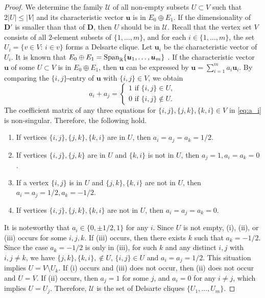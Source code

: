 \documentclass[a4paper, 11pt]{article}
\newcommand{\D}{\boldsymbol{D}}
\newcommand{\uv}{\boldsymbol{u}}
\theoremstyle{definition}
\begin{document}
\begin{proof}
We determine the family $\mathcal{U}$ of all non-empty subsets $U\subset V$ such that $2|U|\leq |V|$ and its characteristic vector $\uv$ is in $E_0 \oplus E_1$. 
If the dimensionality of $\D'$ is smaller than
that of $\D$, then $U$ should be in $\mathcal{U}$. 
Recall that the vertex set $V$ consists of all $2$-element subsets of $\{1,\ldots, m\}$, and for each $i \in \{1,\ldots, m\}$, the set $U_i = \{v \in V \colon\, i \in v\}$ forms a Delsarte clique. 
Let $\uv_i$ be the characteristic vector of $U_i$. 
It is known that $E_0 \oplus E_1={\rm Span}_{\mathbb{R}}\{\uv_1,\ldots, \uv_m\}$ \cite{M03}.  
If the characteristic vector $\uv$ of some $U\subset V$ is in $E_0 \oplus E_1$, then $\uv$ can be expressed by $\uv=\sum_{i=1}^m a_i \uv_i$. 
By comparing the $\{i,j\}$-entry of $\uv$ with $\{i,j\} \in V$, we obtain  
\begin{equation} \label{eq:a_i}
a_i+a_j=\begin{cases}
1 \text{ if $\{i,j\} \in U$},\\
0 \text{ if $\{i,j\} \not\in U$}.
\end{cases}
\end{equation}
The coefficient matrix of any three equations for $\{i,j\},\{j,k\}, \{k,i\} \in V$ in \eqref{eq:a_i} is non-singular. Therefore, the following hold. 
\begin{enumerate}
\item[(i)] If vertices $\{i,j\},\{j,k\},\{k,i\}$ are in $U$, then $a_i=a_j=a_k=1/2$.  
\item[(ii)] If vertices $\{i,j\},\{j,k\}$ are in $U$ and $\{k,i\}$ is not in $U$, then $a_j=1,a_i=a_k=0$. 
\item[(iii)] If a vertex $\{i,j\}$ is in $U$ and $\{j,k\},\{k,i\}$ are not in $U$, then $a_i=a_j=1/2,a_k=-1/2$.  
\item[(iv)] If vertices $\{i,j\},\{j,k\},\{k,i\}$ are not in $U$, then $a_i=a_j=a_k=0$.  
\end{enumerate}
It is noteworthy that $a_i \in \{0,\pm 1/2,1\}$ for any $i$. Since $U$ is not empty, (i), (ii), or  (iii) occurs for some $i,j,k$. 
If (iii) occurs,  
then there exists $k$ such that $a_k=-1/2$. 
Since the case $a_k=-1/2$ is only in (iii), for such $k$ and any distinct $i,j$ with $i,j\ne k$, we have $\{j,k\}, \{k,i\}, \not\in U$, $\{i,j\} \in U$ and $a_i=a_j=1/2$. This situation implies $U=V \setminus U_k$. 
If (i) occurs and (iii) does not occur, then (ii) does not occur and $U=V$. 
If (ii) occurs, then $a_j=1$ for some $j$, and $a_i=0$ for any $i\ne j$, which implies  $U=U_j$. 
Therefore,  $\mathcal{U}$ is the set of Delsarte cliques $\{U_1,\ldots,U_m\}$. 



\end{proof}
\end{document}
